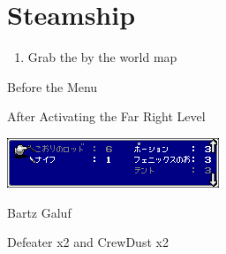 \chapter{Steamship}

\vspace{\baselineskip}

\begin{paracol}{2}

\vspace{-0.2cm}
\begin{enumerate}
    \item Grab the  by the world map
\end{enumerate}
\vspace{-0.2cm}

\switchcolumn
\begin{steproute}{Before the Menu}
\end{steproute}

\switchcolumn
\begin{menu}{After Activating the Far Right Level}
    \varwb
    \begin{itemMenu}
        \potionMenu {}
        \item {}
        \item[] \includegraphics[scale=1.24]{../Graphics/Battle/3. Steamship Menu.png}
    \end{itemMenu}
    \begin{rowMenu}
        \swap Bartz \switch Galuf
    \end{rowMenu}
    \varwe
\end{menu}

\switchcolumn*
\begin{steproute}{Defeater x2 and CrewDust x2}
\end{steproute}


\end{paracol}
